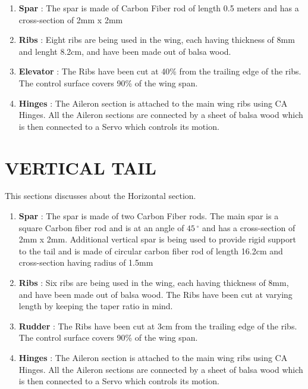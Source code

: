 \begin{enumerate}
\item \textbf{Spar} : The spar is made of Carbon Fiber rod of length 0.5 meters and has a cross-section of 2mm x 2mm
\item \textbf{Ribs} : Eight ribs are being used in the wing, each having thickness of 8mm and lenght 8.2cm, and have been made out of balsa wood. 
\item \textbf{Elevator} : The Ribs have been cut at 40\% from the trailing edge of the ribs. The control surface covers 90\% of the wing span.
\item \textbf{Hinges} : The Aileron section is attached to the main wing ribs using CA Hinges. All the Aileron sections are connected by a sheet of balsa wood which is then connected to a Servo which controls its motion.
\end{enumerate}

\section{VERTICAL TAIL}
\label{s:ch4_verttail_fab}
This sections discusses about the Horizontal section.

\begin{enumerate}
\item \textbf{Spar} : The spar is made of two Carbon Fiber rods. The main spar is a square Carbon fiber rod and is at an angle of $45\,^{\circ}$
 and has a cross-section of 2mm x 2mm. Additional vertical spar is being used to provide rigid support to the tail and is made of circular carbon fiber rod of length 16.2cm and cross-section having radius of 1.5mm 
\item \textbf{Ribs} : Six ribs are being used in the wing, each having thickness of 8mm, and have been made out of balsa wood. 
The Ribs have been cut at varying length by keeping the taper ratio in mind.
\item \textbf{Rudder} : The Ribs have been cut at 3cm from the trailing edge of the ribs. The control surface covers 90\% of the wing span.
\item \textbf{Hinges} : The Aileron section is attached to the main wing ribs using CA Hinges. All the Aileron sections are connected by a sheet of balsa wood which is then connected to a Servo which controls its motion.
\end{enumerate}

